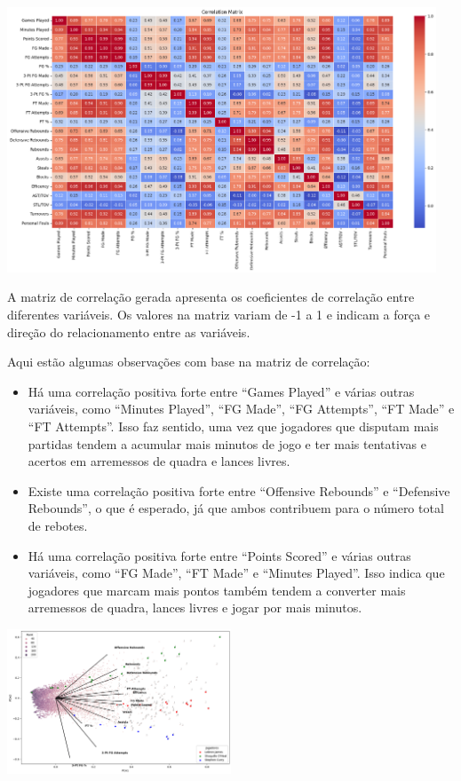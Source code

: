 \documentclass[
]{book}
\begin{document}
\includegraphics[width=5.03125in,height=\textheight]{imagens/5.png}

A matriz de correlação gerada apresenta os coeficientes de correlação entre diferentes variáveis. Os valores na matriz variam de -1 a 1 e indicam a força e direção do relacionamento entre as variáveis.

Aqui estão algumas observações com base na matriz de correlação:

\begin{itemize}
\item
  Há uma correlação positiva forte entre ``Games Played'' e várias outras variáveis, como ``Minutes Played'', ``FG Made'', ``FG Attempts'', ``FT Made'' e ``FT Attempts''. Isso faz sentido, uma vez que jogadores que disputam mais partidas tendem a acumular mais minutos de jogo e ter mais tentativas e acertos em arremessos de quadra e lances livres.
\item
  Existe uma correlação positiva forte entre ``Offensive Rebounds'' e ``Defensive Rebounds'', o que é esperado, já que ambos contribuem para o número total de rebotes.
\item
  Há uma correlação positiva forte entre ``Points Scored'' e várias outras variáveis, como ``FG Made'', ``FT Made'' e ``Minutes Played''. Isso indica que jogadores que marcam mais pontos também tendem a converter mais arremessos de quadra, lances livres e jogar por mais minutos.
\end{itemize}

\includegraphics[width=0.5\textwidth,height=\textheight]{imagens/6.png}
\end{document}
